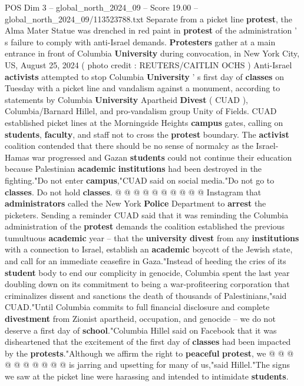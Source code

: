 \begin{textsample}{POS Dim 3 – global\_north\_2024\_09 – Score 19.00 – global\_north\_2024\_09/113523788.txt}  \label{ex:f3_pos_162}
Separate from a picket line \textbf{protest}, the Alma Mater Statue was drenched in red paint in \textbf{protest} of the administration ' s failure to comply with anti-Israel demands. \textbf{Protesters} gather at a main entrance in front of Columbia \textbf{University} during convocation, in New York City, US, August 25, 2024 ( photo credit : REUTERS/CAITLIN OCHS ) Anti-Israel \textbf{activists} attempted to stop Columbia \textbf{University} ' s first day of \textbf{classes} on Tuesday with a picket line and vandalism against a monument, according to statements by Columbia \textbf{University} Apartheid \textbf{Divest} ( CUAD ), Columbia/Barnard Hillel, and pro-vandalism group Unity of Fields.
CUAD established picket lines at the Morningside Heights \textbf{campus} gates, calling on \textbf{students}, \textbf{faculty}, and staff not to cross the \textbf{protest} boundary.
The \textbf{activist} coalition contended that there should be no sense of normalcy as the Israel-Hamas war progressed and Gazan \textbf{students} could not continue their education because Palestinian \textbf{academic} \textbf{institutions} had been destroyed in the fighting."Do not enter \textbf{campus},"CUAD said on social media."Do not go to \textbf{classes}.
Do not hold \textbf{classes}. @ @ @ @ @ @ @ @ @ @ Instagram that \textbf{administrators} called the New York \textbf{Police} Department to \textbf{arrest} the picketers.
Sending a reminder CUAD said that it was reminding the Columbia administration of the \textbf{protest} demands the coalition established the previous tumultuous \textbf{academic} year -- that the \textbf{university} \textbf{divest} from any \textbf{institutions} with a connection to Israel, establish an \textbf{academic} boycott of the Jewish state, and call for an immediate ceasefire in Gaza."Instead of heeding the cries of its \textbf{student} body to end our complicity in genocide, Columbia spent the last year doubling down on its commitment to being a war-profiteering corporation that criminalizes dissent and sanctions the death of thousands of Palestinians,"said CUAD."Until Columbia commits to full financial disclosure and complete \textbf{divestment} from Zionist apartheid, occupation, and genocide -- we do not deserve a first day of \textbf{school}."Columbia Hillel said on Facebook that it was disheartened that the excitement of the first day of \textbf{classes} had been impacted by the \textbf{protests}."Although we affirm the right to \textbf{peaceful} \textbf{protest}, we @ @ @ @ @ @ @ @ @ @ is jarring and upsetting for many of us,"said Hillel."The signs we saw at the picket line were harassing and intended to intimidate \textbf{students}.

\end{textsample}

